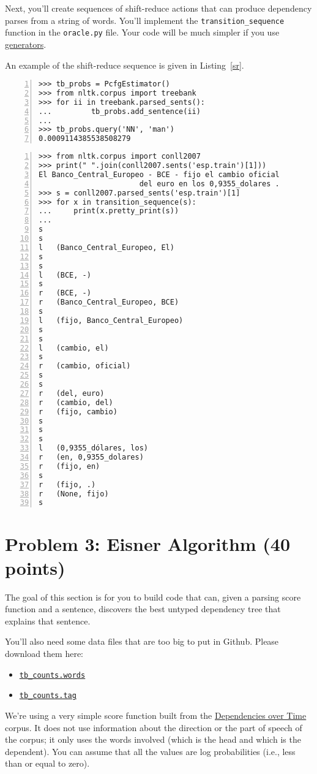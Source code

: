 \documentclass[11pt]{article}
\begin{document}
Next, you'll create sequences of shift-reduce actions that can produce
dependency parses from a string of words.  You'll implement the
\texttt{transition\_sequence} function in the \texttt{oracle.py} file.
Your code will be much simpler if you use
\href{https://wiki.python.org/moin/Generators}{generators}.

An example of the shift-reduce sequence is given in Listing~\ref{sr}.

\begin{lstlisting}[float, label=pcfg,caption=Estimating production probabilities from Treebank data, frame=trBL,escapechar=*, numbers=left, numberstyle=\tiny, numberblanklines=false]
>>> tb_probs = PcfgEstimator()
>>> from nltk.corpus import treebank
>>> for ii in treebank.parsed_sents():
...         tb_probs.add_sentence(ii)
...
>>> tb_probs.query('NN', 'man')
0.0009114385538508279
\end{lstlisting}

\begin{lstlisting}[float, label=sr,caption=Creating a shift-reduce
sequence from a dependency parse, frame=trBL,escapechar=*,
numbers=left, numberstyle=\tiny, numberblanklines=false]
>>> from nltk.corpus import conll2007
>>> print(" ".join(conll2007.sents('esp.train')[1]))
El Banco_Central_Europeo - BCE - fijo el cambio oficial
                       del euro en los 0,9355_dolares .
>>> s = conll2007.parsed_sents('esp.train')[1]
>>> for x in transition_sequence(s):
...     print(x.pretty_print(s))
...
s
s
l	(Banco_Central_Europeo, El)
s
s
l	(BCE, -)
s
r	(BCE, -)
r	(Banco_Central_Europeo, BCE)
s
l	(fijo, Banco_Central_Europeo)
s
s
l	(cambio, el)
s
r	(cambio, oficial)
s
s
r	(del, euro)
r	(cambio, del)
r	(fijo, cambio)
s
s
s
l	(0,9355_dólares, los)
r	(en, 0,9355_dolares)
r	(fijo, en)
s
r	(fijo, .)
r	(None, fijo)
s
\end{lstlisting}

\section*{Problem 3: Eisner Algorithm (40 points)}

The goal of this section is for you to build code that can, given a
parsing score function and a sentence, discovers the best untyped
dependency tree that explains that sentence.

You’ll also need some data files that are too big to put in Github.
Please download them here:
\begin{itemize}
\item \href{http://terpconnect.umd.edu/~ying/cl1/tb_counts.words}{\texttt{tb\_counts.words}}
\item
  \href{http://terpconnect.umd.edu/~ying/cl1/tb_counts.tag}{\texttt{tb\_counts.tag}}
\end{itemize}
We’re using a very simple score function built from the
\href{http://googleresearch.blogspot.com/2013/05/syntactic-ngrams-over-time.html}{Dependencies
  over Time} corpus. It does not use information about the direction
or the part of speech of the corpus; it only uses the words involved
(which is the head and which is the dependent).  You can assume that
all the values are log probabilities (i.e., less than or equal to
zero).
\end{document}
